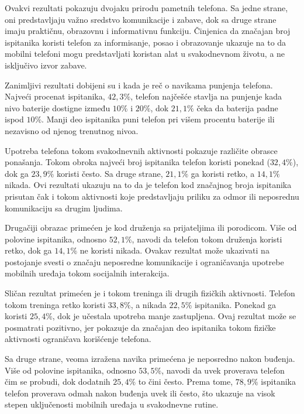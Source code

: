 \documentclass{article}
\begin{document}
Ovakvi rezultati pokazuju dvojaku prirodu pametnih telefona. Sa jedne strane, oni predstavljaju važno sredstvo komunikacije i zabave, dok sa druge strane imaju praktičnu, obrazovnu i informativnu funkciju. Činjenica da značajan broj ispitanika koristi telefon za informisanje, posao i obrazovanje ukazuje na to da mobilni telefoni mogu predstavljati koristan alat u svakodnevnom životu, a ne isključivo izvor zabave.

Zanimljivi rezultati dobijeni su i kada je reč o navikama punjenja telefona. Najveći procenat ispitanika, $42{,}3\%$, telefon najčešće stavlja na punjenje kada nivo baterije dostigne između $10\%$ i $20\%$, dok $21{,}1\%$ čeka da baterija padne ispod $10\%$. Manji deo ispitanika puni telefon pri višem procentu baterije ili nezavisno od njenog trenutnog nivoa.

Upotreba telefona tokom svakodnevnih aktivnosti pokazuje različite obrasce ponašanja. Tokom obroka najveći broj ispitanika telefon koristi ponekad ($32{,}4\%$), dok ga $23{,}9\%$ koristi često. Sa druge strane, $21{,}1\%$ ga koristi retko, a $14{,}1\%$ nikada. Ovi rezultati ukazuju na to da je telefon kod značajnog broja ispitanika prisutan čak i tokom aktivnosti koje predstavljaju priliku za odmor ili neposrednu komunikaciju sa drugim ljudima.

Drugačiji obrazac primećen je kod druženja sa prijateljima ili porodicom. Više od polovine ispitanika, odnosno $52{,}1\%$, navodi da telefon tokom druženja koristi retko, dok ga $14{,}1\%$ ne koristi nikada. Ovakav rezultat može ukazivati na postojanje svesti o značaju neposredne komunikacije i ograničavanja upotrebe mobilnih uređaja tokom socijalnih interakcija.

Sličan rezultat primećen je i tokom treninga ili drugih fizičkih aktivnosti. Telefon tokom treninga retko koristi $33{,}8\%$, a nikada $22{,}5\%$ ispitanika. Ponekad ga koristi $25{,}4\%$, dok je učestala upotreba manje zastupljena. Ovaj rezultat može se posmatrati pozitivno, jer pokazuje da značajan deo ispitanika tokom fizičke aktivnosti ograničava korišćenje telefona.

Sa druge strane, veoma izražena navika primećena je neposredno nakon buđenja. Više od polovine ispitanika, odnosno $53{,}5\%$, navodi da uvek proverava telefon čim se probudi, dok dodatnih $25{,}4\%$ to čini često. Prema tome, $78{,}9\%$ ispitanika telefon proverava odmah nakon buđenja uvek ili često, što ukazuje na visok stepen uključenosti mobilnih uređaja u svakodnevne rutine.
\end{document}

